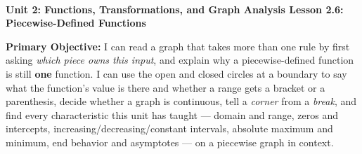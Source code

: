 \documentclass[10pt]{article}
\newcommand{\UnitNumberName}{Unit 2: Functions, Transformations, and Graph Analysis \quad}
\newcommand{\LessonNumberName}{Lesson 2.6: Piecewise-Defined Functions}
\begin{document}
\begin{center}
    {\Large\bfseries \CourseName \\
    {\small\bfseries \UnitNumberName \LessonNumberName}}
\end{center}

\begin{tcolorbox}[colback=mist, colframe=royal, boxrule=0.9pt, arc=2mm,
    left=2mm, right=2mm, top=1.5mm, bottom=1.5mm]
    \textbf{Primary Objective:} I can read a graph that takes more than one rule by first asking
    \emph{which piece owns this input}, and explain why a piecewise-defined function is still
    \textbf{one} function. I can use the open and closed circles at a boundary to say what the
    function's value is there and whether a range gets a bracket or a parenthesis, decide whether a
    graph is continuous, tell a \emph{corner} from a \emph{break}, and find every characteristic this
    unit has taught --- domain and range, zeros and intercepts, increasing/decreasing/constant
    intervals, absolute maximum and minimum, end behavior and asymptotes --- on a piecewise graph in
    context.
\end{tcolorbox}
\end{document}
